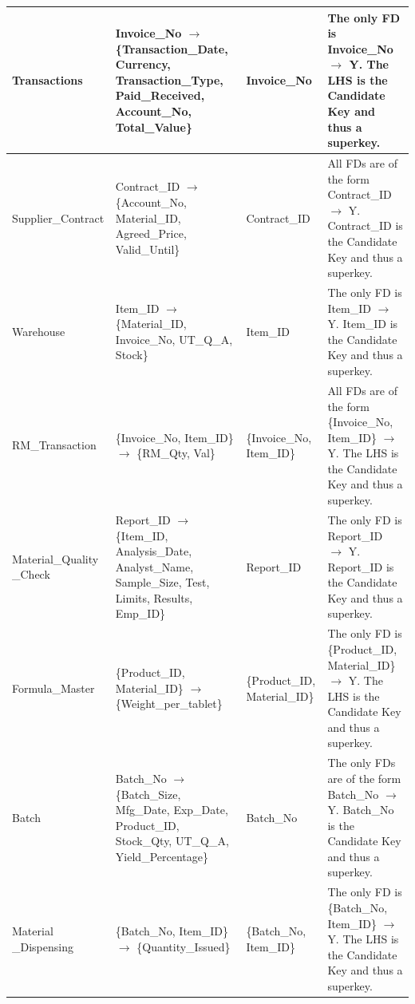 \documentclass[12pt, a4paper]{article}
\begin{document}
\begin{longtable}{|p{}|p{}|p{}|p{}|}
Transactions & 
Invoice\_No $\rightarrow$ \{Transaction\_Date, Currency, Transaction\_Type, Paid\_Received, Account\_No, Total\_Value\} & 
Invoice\_No & 
The only FD is Invoice\_No $\rightarrow$ Y. The LHS is the Candidate Key and thus a superkey. \\ \hline

Supplier\_Contract & 
Contract\_ID $\rightarrow$ \{Account\_No, Material\_ID, Agreed\_Price, Valid\_Until\} & 
Contract\_ID & 
All FDs are of the form Contract\_ID $\rightarrow$ Y. Contract\_ID is the Candidate Key and thus a superkey. \\ \hline

Warehouse & 
Item\_ID $\rightarrow$ \{Material\_ID, Invoice\_No, UT\_Q\_A, Stock\} & 
Item\_ID & 
The only FD is Item\_ID $\rightarrow$ Y. Item\_ID is the Candidate Key and thus a superkey. \\ \hline

RM\_Transaction & 
\{Invoice\_No, Item\_ID\} $\rightarrow$ \{RM\_Qty, Val\} & 
\{Invoice\_No, Item\_ID\} & 
All FDs are of the form \{Invoice\_No, Item\_ID\} $\rightarrow$ Y. The LHS is the Candidate Key and thus a superkey. \\ \hline

Material\_Quality \newline \_Check & 
Report\_ID $\rightarrow$ \{Item\_ID, Analysis\_Date, Analyst\_Name, Sample\_Size, Test, Limits, Results, Emp\_ID\} & 
Report\_ID & 
The only FD is Report\_ID $\rightarrow$ Y. Report\_ID is the Candidate Key and thus a superkey. \\ \hline

Formula\_Master & 
\{Product\_ID, Material\_ID\} $\rightarrow$ \{Weight\_per\_tablet\} & 
\{Product\_ID, Material\_ID\} & 
The only FD is \{Product\_ID, Material\_ID\} $\rightarrow$ Y. The LHS is the Candidate Key and thus a superkey. \\ \hline

Batch & 
Batch\_No $\rightarrow$ \{Batch\_Size, Mfg\_Date, Exp\_Date, Product\_ID, Stock\_Qty, UT\_Q\_A, Yield\_Percentage\} & 
Batch\_No & 
The only FDs are of the form Batch\_No $\rightarrow$ Y. Batch\_No is the Candidate Key and thus a superkey. \\ \hline

Material \newline \_Dispensing & 
\{Batch\_No, Item\_ID\} $\rightarrow$ \{Quantity\_Issued\} & 
\{Batch\_No, Item\_ID\} & 
The only FD is \{Batch\_No, Item\_ID\} $\rightarrow$ Y. The LHS is the Candidate Key and thus a superkey. \\ \hline


\end{longtable}
\end{document}
